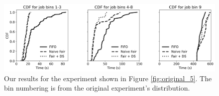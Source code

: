 \begin{figure}
  \centering
  \includegraphics[width=\linewidth]{figures/running-times.png}
  \caption{Our results for the experiment shown in Figure \ref{fig:original_5}. The bin numbering is from the original experiment's distribution.}
  \label{fig:reproduced_5}
\end{figure}

